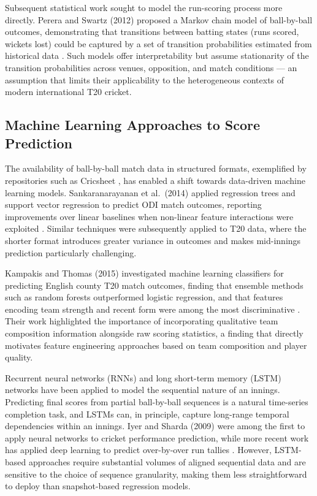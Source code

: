 Subsequent statistical work sought to model the run-scoring process more directly. Perera and Swartz (2012) proposed a Markov chain model of ball-by-ball outcomes, demonstrating that transitions between batting states (runs scored, wickets lost) could be captured by a set of transition probabilities estimated from historical data \cite{perera2012markov}. Such models offer interpretability but assume stationarity of the transition probabilities across venues, opposition, and match conditions --- an assumption that limits their applicability to the heterogeneous contexts of modern international T20 cricket.

\subsection{Machine Learning Approaches to Score Prediction}

The availability of ball-by-ball match data in structured formats, exemplified by repositories such as Cricsheet \cite{cricsheet}, has enabled a shift towards data-driven machine learning models. Sankaranarayanan et al.\ (2014) applied regression trees and support vector regression to predict ODI match outcomes, reporting improvements over linear baselines when non-linear feature interactions were exploited \cite{sankaranarayanan2014cricket}. Similar techniques were subsequently applied to T20 data, where the shorter format introduces greater variance in outcomes and makes mid-innings prediction particularly challenging.

Kampakis and Thomas (2015) investigated machine learning classifiers for predicting English county T20 match outcomes, finding that ensemble methods such as random forests outperformed logistic regression, and that features encoding team strength and recent form were among the most discriminative \cite{kampakis2015using}. Their work highlighted the importance of incorporating qualitative team composition information alongside raw scoring statistics, a finding that directly motivates feature engineering approaches based on team composition and player quality.

Recurrent neural networks (RNNs) and long short-term memory (LSTM) networks have been applied to model the sequential nature of an innings. Predicting final scores from partial ball-by-ball sequences is a natural time-series completion task, and LSTMs can, in principle, capture long-range temporal dependencies within an innings. Iyer and Sharda (2009) were among the first to apply neural networks to cricket performance prediction, while more recent work has applied deep learning to predict over-by-over run tallies \cite{iyer2009prediction}. However, LSTM-based approaches require substantial volumes of aligned sequential data and are sensitive to the choice of sequence granularity, making them less straightforward to deploy than snapshot-based regression models.

